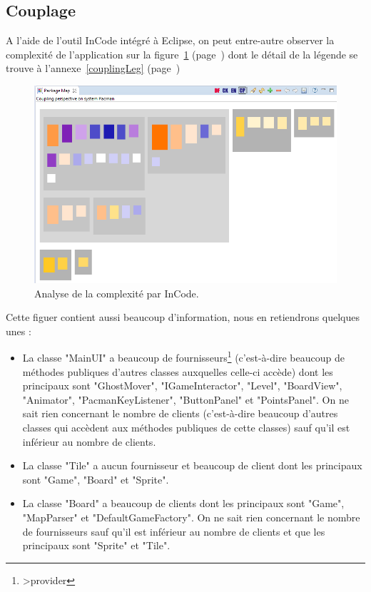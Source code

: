 \documentclass[12pt,a4paper,final]{article}
\newcommand{\annexe}[1]{annexe~\ref{#1} (page~\pageref{#1})}
\newcommand{\labelfigure}[1]{figure~\ref{#1} (page~\pageref{#1})}
\begin{document}
\subsection{Couplage}
A l'aide de l'outil InCode intégré à Eclipse, on peut entre-autre observer la complexité de l'application sur la \labelfigure{coupling} dont le détail de la légende se trouve à l'\annexe{couplingLeg}
\begin{figure}[!h]
	\centering
	\includegraphics[width=\textwidth]{InCodeCoupling.png}
	\caption{\label{coupling}Analyse de la complexité par InCode.}
\end{figure}
Cette figuer contient aussi beaucoup d'information, nous en retiendrons quelques unes : 
\begin {itemize}
\item La classe "MainUI" a beaucoup de fournisseurs\footnote{>provider} (c'est-à-dire beaucoup de méthodes publiques d'autres classes auxquelles celle-ci accède) dont les principaux sont "GhostMover", "IGameInteractor", "Level", "BoardView", "Animator", "PacmanKeyListener", "ButtonPanel" et "PointsPanel". On ne sait rien concernant le nombre de clients (c'est-à-dire beaucoup d'autres classes qui accèdent aux méthodes publiques de cette classes) sauf qu'il est inférieur au nombre de clients.
\item La classe "Tile" a aucun fournisseur et beaucoup de client dont les principaux sont "Game", "Board" et "Sprite".
\item La classe "Board" a beaucoup de clients dont les principaux sont "Game", "MapParser" et "DefaultGameFactory". On ne sait rien concernant le nombre de fournisseurs sauf qu'il est inférieur au nombre de clients et que les principaux sont "Sprite" et "Tile".
\end{itemize}
\end{document}
